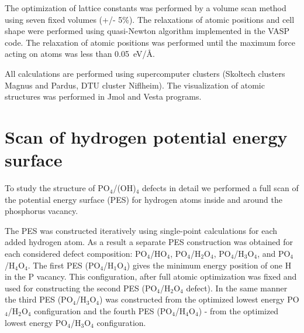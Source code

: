 The optimization of lattice constants was performed by a volume scan method using seven fixed volumes (+/- 5\%). The relaxations of atomic positions and cell shape were performed using quasi-Newton algorithm implemented in the VASP code.
The relaxation of atomic positions was performed until the maximum force acting on atoms was less than 0.05~eV/\AA. 



All calculations are performed using supercomputer clusters (Skoltech clusters Magnus and Pardus, DTU cluster Niflheim). The visualization of atomic structures was performed in Jmol and Vesta programs.


\section{Scan of hydrogen potential energy surface}

To study the structure of PO$_4$/(OH)$_4$ defects in detail we performed a full scan of the potential energy surface (PES) for hydrogen atoms inside and around the phosphorus vacancy. 

The PES was constructed iteratively using single-point calculations for each added hydrogen atom. As a result a separate PES construction was obtained for each considered defect composition: PO$_4$/HO$_4$, PO$_4$/H$_2$O$_4$, PO$_4$/H$_3$O$_4$, and PO$_4$/H$_4$O$_4$. 
The first PES (PO$_4$/H$_1$O$_4$) gives the minimum energy position of one H in the P vacancy. This configuration, after full atomic optimization was fixed and used for constructing the second PES (PO$_4$/H$_2$O$_4$ defect). In the same manner the third PES (PO$_4$/H$_3$O$_4$) was constructed from the optimized lowest energy PO$_4$/H$_2$O$_4$ configuration and the fourth PES (PO$_4$/H$_4$O$_4$) - from the optimized lowest energy PO$_4$/H$_3$O$_4$ configuration. 


